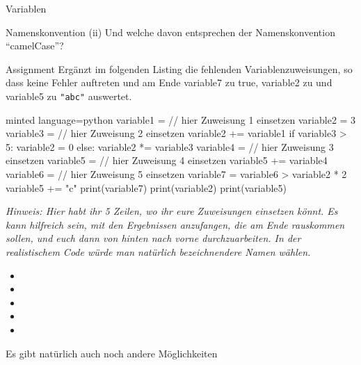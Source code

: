 \begin{task}[points=auto]{Variablen }
\begin{subtask*}[points=0]{Namenskonvention}
        (ii) Und welche davon entsprechen der Namenskonvention \enquote{camelCase}?
    \end{subtask*}
    \begin{subtask*}[points=0]{Assignment}
        Ergänzt im folgenden Listing die fehlenden Variablenzuweisungen, so dass keine Fehler auftreten und am Ende {\ttfamily variable7} zu {\ttfamily true}, {\ttfamily variable2} zu {} und {\ttfamily variable5} zu {\ttfamily \verb+"abc"+} auswertet.
        \begin{codeBlock}[]{minted language=python}
            variable1 = // hier Zuweisung 1 einsetzen
            variable2 = 3
            variable3 = // hier Zuweisung 2 einsetzen
            variable2 += variable1
            if variable3 > 5:
                variable2 = 0
            else:
                variable2 *= variable3
            variable4 = // hier Zuweisung 3 einsetzen
            variable5 = // hier Zuweisung 4 einsetzen
            variable5 += variable4
            variable6 = // hier Zuweisung 5 einsetzen
            variable7 = variable6 > variable2 * 2
            variable5 += "c"
            print(variable7)
            print(variable2)
            print(variable5)
        \end{codeBlock}

        \textit{Hinweis: Hier habt ihr 5 Zeilen, wo ihr eure Zuweisungen einsetzen könnt. Es kann hilfreich sein, mit den Ergebnissen anzufangen, die am Ende rauskommen sollen, und euch dann von hinten nach vorne durchzuarbeiten. In der realistischem Code würde man natürlich bezeichnendere Namen wählen.}

        \begin{solution}
            \begin{itemize}
                \item {}
                \item {}
                \item {}
                \item {}
                \item {}
            \end{itemize}
            Es gibt natürlich auch noch andere Möglichkeiten
        \end{solution}
    \end{subtask*}
\end{task}
